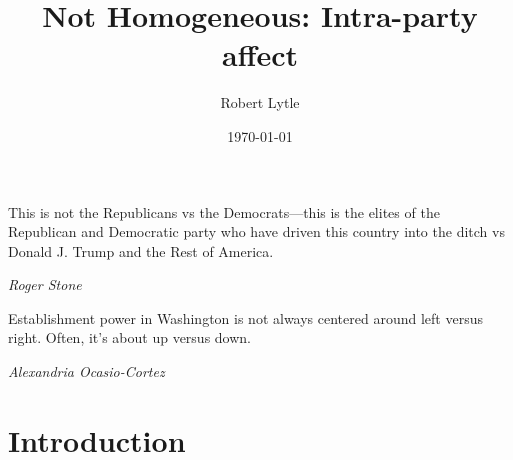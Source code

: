 \documentclass[12pt]{paper}
\begin{document}
\title{Not Homogeneous: Intra-party affect}
\author{Robert Lytle}
\date{\today}
\maketitle
\epigraph{This is not the Republicans vs the Democrats---this is the elites of the Republican and Democratic party who have driven this country into the ditch vs Donald J. Trump and the Rest of America.}{\textit{Roger Stone %
}}
\epigraph{Establishment power in Washington is not always centered around left versus right. Often, it’s about up versus down.}{\textit{Alexandria Ocasio-Cortez}}



\section{Introduction}
\end{document}
